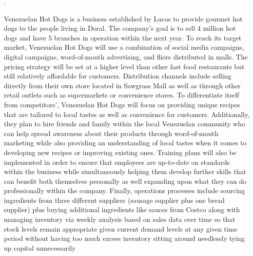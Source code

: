 . 

Venezuelan Hot Dogs is a business established by Lucas to provide gourmet hot dogs to the people living in Doral. The company's goal is to sell 4 million hot dogs and have 5 branches in operation within the next year. To reach its target market, Venezuelan Hot Dogs will use a combination of social media campaigns, digital campaigns, word-of-mouth advertising, and fliers distributed in malls. The pricing strategy will be set at a higher level than other fast food restaurants but still relatively affordable for customers. Distribution channels include selling directly from their own store located in Sawgrass Mall as well as through other retail outlets such as supermarkets or convenience stores. To differentiate itself from competitors', Venezuelan Hot Dogs will focus on providing unique recipes that are tailored to local tastes as well as convenience for customers. Additionally, they plan to hire friends and family within the local Venezuelan community who can help spread awareness about their products through word-of-mouth marketing while also providing an understanding of local tastes when it comes to developing new recipes or improving existing ones. Training plans will also be implemented in order to ensure that employees are up-to-date on standards within the business while simultaneously helping them develop further skills that can benefit both themselves personally as well expanding upon what they can do professionally within the company. Finally, operations processes include sourcing ingredients from three different suppliers (sausage supplier plus one bread supplier) plus buying additional ingredients like sauces from Costco along with managing inventory via weekly analysis based on sales data over time so that stock levels remain appropriate given current demand levels at any given time period without having too much excess inventory sitting around needlessly tying up capital unnecessarily